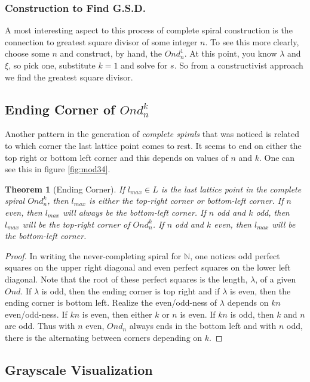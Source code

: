 \documentclass[11pt]{amsart}
\theoremstyle{mydef}
\newtheorem{thm}{Theorem}[section]
\begin{document}
\subsubsection{Construction to Find G.S.D.}
A most interesting aspect to this process of complete spiral construction is the connection to greatest square divisor of some integer $n$. To see this more clearly, choose some $n$ and construct, by hand, the $Ond^1_n$. At this point, you know $\lambda$ and $\xi$, so pick one, substitute $k = 1$ and solve for $s$. So from a constructivist approach we find the greatest square divisor.

\subsection{Ending Corner of $Ond^k_n$}

Another pattern in the generation of \textit{complete spirals} that was noticed is related to which corner the last lattice point comes to rest. It seems to end on either the top right or bottom left corner and this depends on values of $n$ and $k$. One can see this in figure \ref{fig:mod34}. 

\begin{thm}[Ending Corner]
If $l_{max} \in L$ is the last lattice point in the complete spiral $Ond^k_n$, then $l_{max}$ is either the top-right corner or bottom-left corner. If $n$ even, then $l_{max}$ will always be the bottom-left corner. If $n$ odd and $k$ odd, then $l_{max}$ will be the top-right corner of $Ond^k_n$. If $n$ odd and $k$ even, then $l_{max}$ will be the bottom-left corner.
\end{thm}

\begin{proof}
In writing the never-completing spiral for $\mathbb{N}$, one notices odd perfect squares on the upper right diagonal and even perfect squares on the lower left diagonal. Note that the root of these perfect squares is the length, $\lambda$, of a given $Ond$. If $\lambda$ is odd, then the ending corner is top right and if $\lambda$ is even, then the ending corner is bottom left. Realize the even/odd-ness of $\lambda$ depends on $kn$ even/odd-ness. If $kn$ is even, then either $k$ or $n$ is even. If $kn$ is odd, then $k$ and $n$ are odd. Thus with $n$ even, $Ond_n$ always ends in the bottom left and with $n$ odd, there is the alternating between corners depending on $k$.
\end{proof}


\subsection{Grayscale Visualization}
\end{document}
